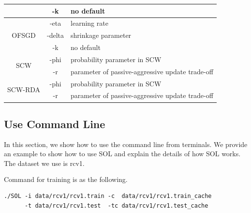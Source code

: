 \documentclass[11pt,a4paper]{article}
\begin{document}
\begin{enumerate}
\begin{table}[!ht]
\begin{tabular}{|c|c|p{9cm}|}
                \cline{2-3}
                & -k& no default\\
                \hline
                \multirow{3}{*}{OFSGD}& -eta & learning rate\\
                \cline{2-3}
                & -delta & shrinkage parameter\\
                \cline{2-3}
                & -k& no default\\
                \hline
                \multirow{2}{*}{SCW}& -phi & probability parameter in SCW\\
                \cline{2-3}
                & -r & parameter of passive-aggressive update trade-off\\
                \hline
                \multirow{2}{*}{SCW-RDA}& -phi & probability parameter in SCW\\
                \cline{2-3}
                & -r & parameter of passive-aggressive update trade-off\\
                \hline
            \end{tabular}
        \end{table}
\end{enumerate}

\subsection{Use Command Line}
In this section, we show how to use the command line from terminals. We provide
an example to show how to use SOL and explain the details of how SOL works. The
dataset we use is rcv1.

Command for training is as the following.
\lstset{language=bash,
framexleftmargin=0.5cm,
xleftmargin=0.5cm,
}
\begin{lstlisting}
./SOL -i data/rcv1/rcv1.train -c  data/rcv1/rcv1.train_cache 
      -t data/rcv1/rcv1.test  -tc data/rcv1/rcv1.test_cache
\end{lstlisting}
\end{document}
